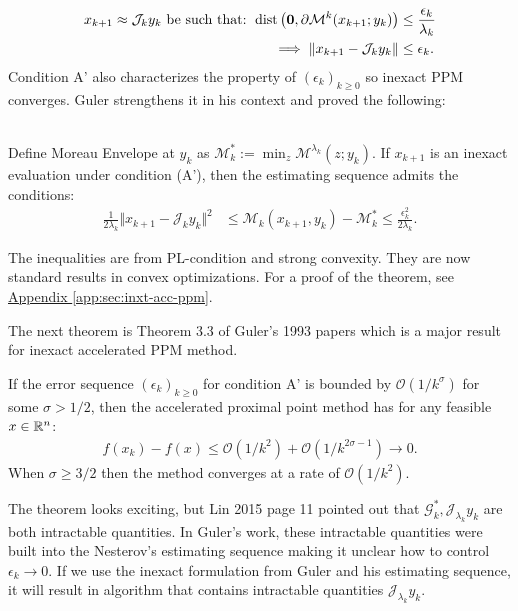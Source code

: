 \documentclass[12pt]{article}
\begin{document}
    \begin{align*}
        x_{k + 1}\approx \mathcal J_{k} y_k \text{ be such that: }
        \operatorname{dist}\left(
            \mathbf 0, \partial \mathcal M^{k}(x_{k + 1}; y_k)
        \right) &\le \frac{\epsilon_k}{\lambda_k}
        \\
        \implies 
        \Vert x_{k + 1} - \mathcal J_{k}y_k\Vert 
        &\le \epsilon_k. 
    \end{align*}
    Condition A' also characterizes the property of $(\epsilon_k)_{k\ge 0}$ so inexact PPM converges. 
    Guler strengthens it in his context and proved the following: 
    \begin{theorem}\label{thm:guler-inexact-ppm-bound}
        \;\\
        Define Moreau Envelope at $y_k$ as $\mathcal M_k^* := \min_z \mathcal {M}^{\lambda_k}(z; y_k)$. 
        If $x_{k +1}$ is an inexact evaluation under condition (A'), then the estimating sequence admits the conditions: 
        \begin{align*}
            \frac{1}{2\lambda_k} \Vert x_{k + 1} - \mathcal J_k y_k\Vert^2
            &\le 
            \mathcal M_k(x_{k + 1}, y_k) - \mathcal M^*_k
            \le \frac{\epsilon_k^2}{2\lambda_k}. 
        \end{align*}
    \end{theorem}
    \begin{remark}
        The inequalities are from PL-condition and strong convexity. 
        They are now standard results in convex optimizations. 
        For a proof of the theorem, see 
        \hyperref[app:sec:inxt-acc-ppm]{Appendix \ref*{app:sec:inxt-acc-ppm}}. 
    \end{remark}
    The next theorem is Theorem 3.3 of Guler's 1993 papers which is a major result for inexact accelerated PPM method. 
    \begin{theorem}
        If the error sequence $(\epsilon_k)_{k \ge0}$ for condition A' is bounded by $\mathcal O(1/k^\sigma)$ for some $\sigma > 1/2$, then the accelerated proximal point method has for any feasible $x \in \mathbb R^n$: 
        \begin{align*}
            f(x_k) - f(x) \le \mathcal O(1/k^2) + \mathcal O (1 / k^{2\sigma - 1})\rightarrow 0. 
        \end{align*}    
        When $\sigma \ge 3/2$ then the method converges at a rate of $\mathcal O(1/k^2)$. 
    \end{theorem}
    The theorem looks exciting, but Lin 2015 \cite{lin_universal_2015} page 11 pointed out that $\mathcal G_k^*, \mathcal J_{\lambda_k} y_k$ are both intractable quantities. 
    In Guler's work, these intractable quantities were built into the Nesterov's estimating sequence making it unclear how to control $\epsilon_k \rightarrow 0$. 
    If we use the inexact formulation from Guler and his estimating sequence, it will result in algorithm that contains intractable quantities $\mathcal J_{\lambda_k} y_k$. 
\end{document}
